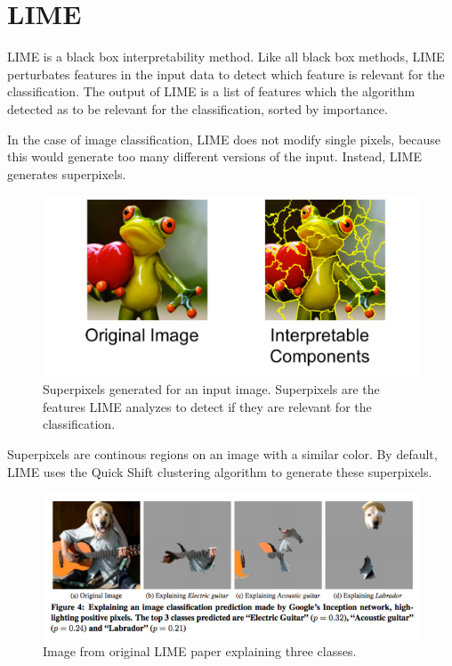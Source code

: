\section{LIME}

LIME \cite{ribeiro2016should} is a black box interpretability method. Like all black box methods, LIME perturbates features in the input data to detect which feature is relevant for the classification. The output of LIME is a list of features which the algorithm detected as to be relevant for the classification, sorted by importance.

In the case of image classification, LIME does not modify single pixels, because this would generate too many different versions of the input.
Instead, LIME generates superpixels.

\begin{figure}[H]
\centering
\includegraphics[width=14cm]{chapters/02_methods/images/lime.jpg}
\caption{Superpixels generated for an input image. Superpixels are the features LIME analyzes to detect if they are relevant for the classification.}
\end{figure}

Superpixels are continous regions on an image with a similar color. By default, LIME uses the Quick Shift \cite{vedaldi2008quick} clustering algorithm to generate these superpixels.




\begin{figure}[H]
\centering
\includegraphics[width=14cm]{chapters/02_methods/images/lime.png}
\caption{Image from original LIME paper explaining three classes.}
\end{figure}
